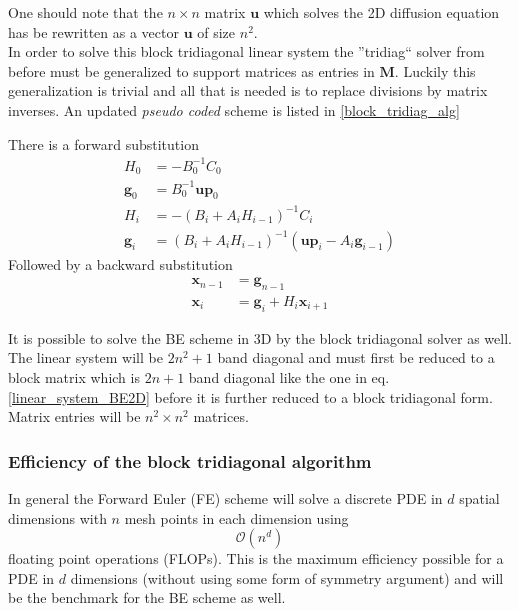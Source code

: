 One should note that the $n\times n$ matrix $\mathbf u$ which solves the 2D diffusion equation has be rewritten as a vector $\mathbf{u}$ of size $n^2$. \\ 

In order to solve this block tridiagonal linear system the ''tridiag`` solver from before must be generalized to support matrices as entries in $\mathbf M$. 
Luckily this generalization is trivial and all that is needed is to replace divisions by matrix inverses. 
An updated \emph{pseudo coded} scheme is listed in \eqref{block_tridiag_alg}

There is a forward substitution
\begin{align}\label{block_tridiag_alg}
 H_0 &= -B_0^{-1}C_0\nonumber \\
 \mathbf{g}_0 &= B_0^{-1}\mathbf{up}_0 \nonumber\\
 H_i &= -\left(B_i+A_iH_{i-1}\right)^{-1}C_i \nonumber \\
 \mathbf{g}_i &= \left(B_i+A_iH_{i-1}\right)^{-1}\left(\mathbf{up}_i-A_i\mathbf{g}_{i-1}\right)
 \end{align}
 Followed by a backward substitution
 \begin{align*}
  \mathbf{x}_{n-1} &= \mathbf{g}_{n-1}\nonumber\\
  \mathbf{x}_i &= \mathbf{g}_i + H_i\mathbf{x}_{i+1} \nonumber
 \end{align*}
 
 It is possible to solve the BE scheme in 3D by the block tridiagonal solver as well. 
 The linear system will be $2n^2 +1$ band diagonal and must first be reduced to a block matrix which is $2n+1$ band diagonal like the one in eq. \eqref{linear_system_BE2D} before it is further reduced to a block tridiagonal form. 
 Matrix entries will be $n^2\times n^2$ matrices.
 
 \subsubsection{Efficiency of the block tridiagonal algorithm}
 
 In general the Forward Euler (FE) scheme will solve a discrete PDE in $d$ spatial dimensions with $n$ mesh points in each dimension using
 \begin{equation*}
  \mathcal O(n^d)
 \end{equation*}
floating point operations (FLOPs). 
This is the maximum efficiency possible for a PDE in $d$ dimensions (without using some form of symmetry argument) and will be the benchmark for the BE scheme as well.\\

